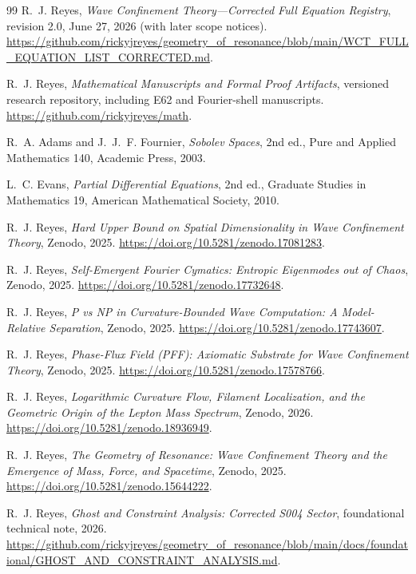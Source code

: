 \documentclass[11pt,letterpaper]{article}
\theoremstyle{definition}
\theoremstyle{remark}
\begin{document}
\begin{thebibliography}{99}
R.~J. Reyes, \emph{Wave Confinement Theory---Corrected Full Equation Registry},
revision 2.0, June 27, 2026 (with later scope notices).
\url{https://github.com/rickyjreyes/geometry_of_resonance/blob/main/WCT_FULL_EQUATION_LIST_CORRECTED.md}.

R.~J. Reyes, \emph{Mathematical Manuscripts and Formal Proof Artifacts},
versioned research repository, including E62 and Fourier-shell manuscripts.
\url{https://github.com/rickyjreyes/math}.

R.~A. Adams and J.~J.~F. Fournier, \emph{Sobolev Spaces},
2nd ed., Pure and Applied Mathematics 140, Academic Press, 2003.

L.~C. Evans, \emph{Partial Differential Equations}, 2nd ed.,
Graduate Studies in Mathematics 19, American Mathematical Society, 2010.

R.~J. Reyes, \emph{Hard Upper Bound on Spatial Dimensionality in
Wave Confinement Theory}, Zenodo, 2025.
\url{https://doi.org/10.5281/zenodo.17081283}.

R.~J. Reyes, \emph{Self-Emergent Fourier Cymatics: Entropic Eigenmodes
out of Chaos}, Zenodo, 2025.
\url{https://doi.org/10.5281/zenodo.17732648}.

R.~J. Reyes, \emph{P vs NP in Curvature-Bounded Wave Computation:
A Model-Relative Separation}, Zenodo, 2025.
\url{https://doi.org/10.5281/zenodo.17743607}.

R.~J. Reyes, \emph{Phase-Flux Field (PFF): Axiomatic Substrate for
Wave Confinement Theory}, Zenodo, 2025.
\url{https://doi.org/10.5281/zenodo.17578766}.

R.~J. Reyes, \emph{Logarithmic Curvature Flow, Filament Localization,
and the Geometric Origin of the Lepton Mass Spectrum}, Zenodo, 2026.
\url{https://doi.org/10.5281/zenodo.18936949}.

R.~J. Reyes, \emph{The Geometry of Resonance: Wave Confinement Theory
and the Emergence of Mass, Force, and Spacetime}, Zenodo, 2025.
\url{https://doi.org/10.5281/zenodo.15644222}.

R.~J. Reyes, \emph{Ghost and Constraint Analysis: Corrected S004 Sector},
foundational technical note, 2026.
\url{https://github.com/rickyjreyes/geometry_of_resonance/blob/main/docs/foundational/GHOST_AND_CONSTRAINT_ANALYSIS.md}.
\end{thebibliography}
\end{document}
